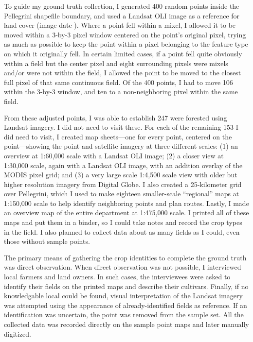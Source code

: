 To guide my ground truth collection, I generated 400 random points inside the Pellegrini shapefile boundary, and used a Landsat OLI image as a reference for land cover (image date ). Where a point fell within a mixel, I allowed it to be moved within a 3-by-3 pixel window centered on the point's original pixel, trying as much as possible to keep the point within a pixel belonging to the feature type on which it originally fell. In certain limited cases, if a point fell quite obviously within a field but the center pixel and eight surrounding pixels were mixels and/or were not within the field, I allowed the point to be moved to the closest full pixel of that same continuous field. Of the 400 points, I had to move 106 within the 3-by-3 window, and ten to a non-neighboring pixel within the same field.

From these adjusted points, I was able to establish 247 were forested using Landsat imagery. I did not need to visit these. For each of the remaining 153 I did need to visit, I created map sheets---one for every point, centered on the point---showing the point and satellite imagery at three different scales: (1) an overview at 1:60,000 scale with a Landsat OLI image; (2) a closer view at 1:30,000 scale, again with a Landsat OLI image, with an addition overlay of the MODIS pixel grid; and (3) a very large scale 1:4,500 scale view with older but higher resolution imagery from Digital Globe. I also created a 25-kilometer grid over Pellegrini, which I used to make eighteen smaller-scale ``regional'' maps at 1:150,000 scale to help identify neighboring points and plan routes. Lastly, I made an overview map of the entire department at 1:475,000 scale. I printed all of these maps and put them in a binder, so I could take notes and record the crop types in the field. I also planned to collect data about as many fields as I could, even those without sample points.
 
The primary means of gathering the crop identities to complete the ground truth was direct observation. When direct observation was not possible, I interviewed local farmers and land owners. In such cases, the interviewees were asked to identify their fields on the printed maps and describe their cultivars. Finally, if no knowledgable local could be found, visual interpretation of the Landsat imagery was attempted using the appearance of already-identified fields as reference. If an identification was uncertain, the point was removed from the sample set. All the collected data was recorded directly on the sample point maps and later manually digitized.

